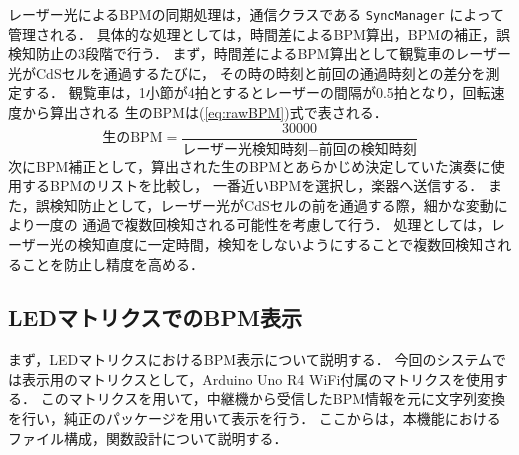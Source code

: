 \documentclass[lualatex,book,paper=a4paper,jafontsize=11.5pt,jafontscale=1.05]{jlreq}
\begin{document}
レーザー光によるBPMの同期処理は，通信クラスである \texttt{SyncManager} によって管理される．
具体的な処理としては，時間差によるBPM算出，BPMの補正，誤検知防止の3段階で行う．
まず，時間差によるBPM算出として観覧車のレーザー光がCdSセルを通過するたびに，
その時の時刻と前回の通過時刻との差分を測定する．
観覧車は，1小節が4拍とするとレーザーの間隔が0.5拍となり，回転速度から算出される
生のBPMは(\ref{eq:rawBPM})式で表される．
\begin{equation}
	\text{生のBPM} = \frac{30000}{\text{レーザー光検知時刻} - \text{前回の検知時刻}} \label{eq:rawBPM}
\end{equation}
次にBPM補正として，算出された生のBPMとあらかじめ決定していた演奏に使用するBPMのリストを比較し，
一番近いBPMを選択し，楽器へ送信する．
また，誤検知防止として，レーザー光がCdSセルの前を通過する際，細かな変動により一度の
通過で複数回検知される可能性を考慮して行う．
処理としては，レーザー光の検知直度に一定時間，検知をしないようにすることで複数回検知されることを防止し精度を高める．




\subsection{LEDマトリクスでのBPM表示}
まず，LEDマトリクスにおけるBPM表示について説明する．
今回のシステムでは表示用のマトリクスとして，Arduino Uno R4 WiFi付属のマトリクスを使用する．
このマトリクスを用いて，中継機から受信したBPM情報を元に文字列変換を行い，純正のパッケージを用いて表示を行う．
ここからは，本機能におけるファイル構成，関数設計について説明する．
\end{document}

